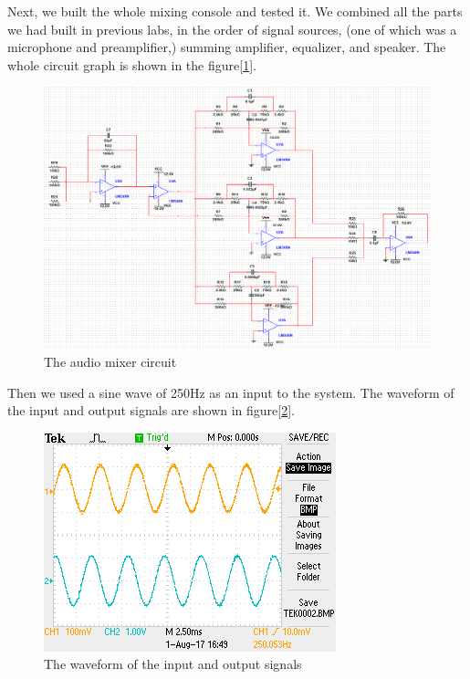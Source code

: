 Next, we built the whole mixing console and tested it.
\phantom{ } We combined all the parts we had built in previous labs, in the order of signal sources, (one of which was a microphone and preamplifier,) summing amplifier, equalizer, and speaker. The whole circuit graph is shown in the figure[\ref{fig:fullcir}]. 

\begin{figure}[!htbp]
	\centering
	\begin{framed}
		\includegraphics[width=\linewidth]{images/circ2.png}
		\caption{The audio mixer circuit}
		\label{fig:fullcir}
	\end{framed}
\end{figure}

\phantom{ } Then we used a sine wave of 250Hz as an input to the system. The waveform of the input and output signals are shown in figure[\ref{fig:wave250}].

\begin{figure}[!htbp]
	\centering
	\begin{framed}
		\includegraphics[width=\linewidth]{images/TEK0002.png}
		\caption{The waveform of the input and output signals}
		\label{fig:wave250}
	\end{framed}
\end{figure}

